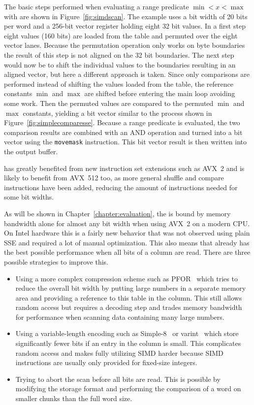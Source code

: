 The basic steps performed when evaluating a range predicate $\min < x < \max$
with \simdscan{} are shown in Figure~\ref{fig:simdscan}. The example uses a bit
width of 20 bits per word and a 256-bit vector register holding eight 32 bit
values.  In a first step eight values (160 bits) are loaded from the table and
permuted over the eight vector lanes. Because the permutation operation only
works on byte boundaries the result of this step is not aligned on the 32 bit
boundaries.  The next step would now be to shift the individual values to the
boundaries resulting in an aligned vector, but here a different approach is
taken. Since only comparisons are performed instead of shifting the values
loaded from the table, the reference constants $\min$ and $\max$ are shifted
before entering the main loop avoiding some work. Then the permuted values are
compared to the permuted $\min$ and $\max$ constants, yielding a bit vector
similar to the process shown in Figure~\ref{fig:simplecomparesse}. Because a
range predicate is evaluated, the two comparison results are combined with an AND
operation and turned into a bit vector using the \texttt{movemask} instruction.
This bit vector result is then written into the output buffer.

\simdscan{} has greatly benefited from new instruction set extensions such as
AVX~2 \cite{AVX2-Scan} and is likely to benefit from AVX~512 too, as more general
shuffle and compare instructions have been added, reducing the amount of
instructions needed for some bit widths.

As will be shown in Chapter~\ref{chapter:evaluation}, the \simdscan{} is bound by
memory bandwidth alone for almost any bit width when using AVX~2 on a modern
CPU. On Intel hardware this is a fairly new behavior that was not observed using
plain SSE \cite{AVX2-Scan} and required a lot of manual optimization. This also
means that \simdscan{} already has the best possible performance when all bits
of a column are read. There are three possible strategies to improve this.

\begin{itemize}
  \item Using a more complex compression scheme such as PFOR~\cite{PFOR} which
    tries to reduce the overall bit width by putting large numbers in a separate
    memory area and providing a reference to this table in the column. This
    still allows random access but requires a decoding step and trades
    memory bandwidth for performance when scanning data containing many large
    numbers.
  \item Using a variable-length encoding such as Simple-8~\cite{Simple8} or
    varint~\cite{varint} which store significantly fewer bits if an entry in the
    column is small. This complicates random access and makes fully utilizing
    SIMD harder because SIMD instructions are usually only provided for
    fixed-size integers.
  \item Trying to abort the scan before all bits are read. This is possible by
    modifying the storage format and performing the comparison of a word on
    smaller chunks than the full word size.
\end{itemize}

